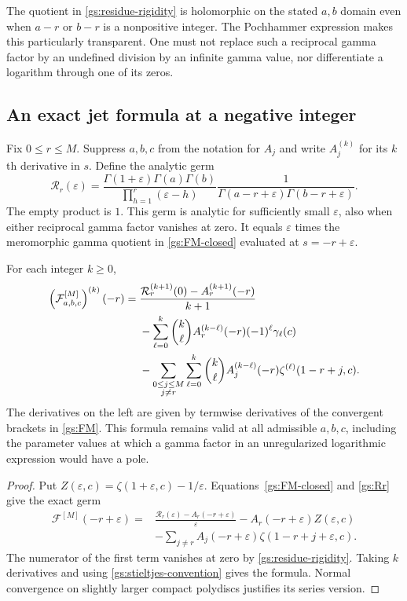 The quotient in \eqref{gs:residue-rigidity} is holomorphic on the stated
$a,b$ domain even when $a-r$ or $b-r$ is a nonpositive integer.  The
Pochhammer expression makes this particularly transparent.  One must
not replace such a reciprocal gamma factor by an undefined division
by an infinite gamma value, nor differentiate a logarithm through one
of its zeros.

\subsection{An exact jet formula at a negative integer}

Fix $0\le r\le M$.  Suppress $a,b,c$ from the notation for $A_j$ and
write $A_j^{(k)}$ for its $k$th derivative in $s$.  Define the analytic
germ
\begin{equation}\label{gs:Rr}
 \mathcal R_r(\varepsilon)=
 \frac{\Gamma(1+\varepsilon)\Gamma(a)\Gamma(b)}
 {\displaystyle\prod_{h=1}^{r}(\varepsilon-h)}
 \frac1{\Gamma(a-r+\varepsilon)\Gamma(b-r+\varepsilon)}.
\end{equation}
The empty product is $1$.  This germ is analytic for sufficiently small
$\varepsilon$, also when either reciprocal gamma factor vanishes at
zero.  It equals $\varepsilon$ times the meromorphic gamma quotient
in \eqref{gs:FM-closed} evaluated at $s=-r+\varepsilon$.

\begin{corollary}\label{gs:resonant-jet}
For each integer $k\ge0$,
\begin{align}
 \left(\mathcal F^{[M]}_{a,b,c}\right)^{(k)}(-r)
 ={}&\frac{\mathcal R_r^{(k+1)}(0)-A_r^{(k+1)}(-r)}{k+1}
 \notag\\
 &-\sum_{\ell=0}^k\binom{k}{\ell}
 A_r^{(k-\ell)}(-r)(-1)^\ell\gamma_\ell(c)
 \notag\\
 &-\sum_{\substack{0\le j\le M\\j\ne r}}
 \sum_{\ell=0}^k\binom{k}{\ell}
 A_j^{(k-\ell)}(-r)\zeta^{(\ell)}(1-r+j,c).
 \label{gs:resonant-jet-formula}
\end{align}
The derivatives on the left are given by termwise derivatives of the
convergent brackets in \eqref{gs:FM}.  This formula remains valid at
all admissible $a,b,c$, including the parameter values at which a gamma
factor in an unregularized logarithmic expression would have a pole.
\end{corollary}

\begin{proof}
Put $Z(\varepsilon,c)=\zeta(1+\varepsilon,c)-1/\varepsilon$.
Equations~\eqref{gs:FM-closed} and \eqref{gs:Rr} give the exact germ
\begin{align*}
 \mathcal F^{[M]}(-r+\varepsilon)
 ={}&\frac{\mathcal R_r(\varepsilon)-A_r(-r+\varepsilon)}{\varepsilon}
 -A_r(-r+\varepsilon)Z(\varepsilon,c)\\
 &-\sum_{j\ne r}A_j(-r+\varepsilon)
 \zeta(1-r+j+\varepsilon,c).
\end{align*}
The numerator of the first term vanishes at zero by
\eqref{gs:residue-rigidity}.  Taking $k$ derivatives and using
\eqref{gs:stieltjes-convention} gives the formula.  Normal convergence
on slightly larger compact polydiscs justifies its series version.
\end{proof}

